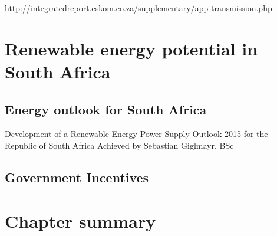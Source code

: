 http://integratedreport.eskom.co.za/supplementary/app-transmission.php

\section{Renewable energy potential in South Africa}

\subsection{Energy outlook for South Africa}
Development of a Renewable Energy Power Supply Outlook 2015 for the Republic of South Africa
Achieved by Sebastian Giglmayr, BSc
\cite{Giglmayr2013}

\subsection{Government Incentives}

\section{Chapter summary}
\pagebreak
